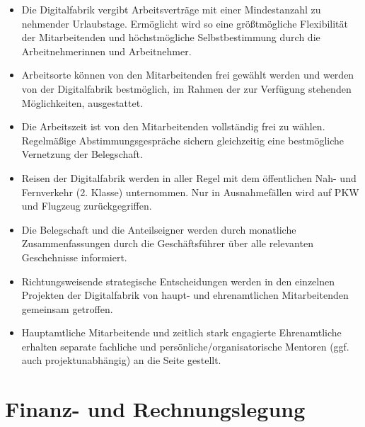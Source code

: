 \documentclass[12pt, a4paper]{article} %
\begin{document}
\begin{itemize}
\item
 
  Die Digitalfabrik vergibt Arbeitsverträge mit einer Mindestanzahl zu
  nehmender Urlaubstage. Ermöglicht wird so eine größtmögliche
  Flexibilität der Mitarbeitenden und höchstmögliche Selbstbestimmung
  durch die Arbeitnehmerinnen und Arbeitnehmer.

\item

  Arbeitsorte können von den Mitarbeitenden frei gewählt werden und
  werden von der Digitalfabrik bestmöglich, im Rahmen der zur Verfügung
  stehenden Möglichkeiten, ausgestattet.
  
\item

  Die Arbeitszeit ist von den Mitarbeitenden vollständig frei zu wählen.
  Regelmäßige Abstimmungsgespräche sichern gleichzeitig eine
  bestmögliche Vernetzung der Belegschaft.

\item
  
  Reisen der Digitalfabrik werden in aller Regel mit dem öffentlichen
  Nah- und Fernverkehr (2. Klasse) unternommen. Nur in Ausnahmefällen
  wird auf PKW und Flugzeug zurückgegriffen.
  
\item
 
  Die Belegschaft und die Anteilseigner werden durch monatliche
  Zusammenfassungen durch die Geschäftsführer über alle relevanten
  Geschehnisse informiert.
 
\item
  
  Richtungsweisende strategische Entscheidungen werden in den einzelnen
  Projekten der Digitalfabrik von haupt- und ehrenamtlichen
  Mitarbeitenden gemeinsam getroffen.
 
\item
 
  Hauptamtliche Mitarbeitende und zeitlich stark engagierte
  Ehrenamtliche erhalten separate fachliche und
  persönliche/organisatorische Mentoren (ggf. auch projektunabhängig) an
  die Seite gestellt.

\end{itemize}

\hypertarget{finanz--und-rechnungslegung}{%
\section{Finanz- und
Rechnungslegung}\label{finanz--und-rechnungslegung}}
\end{document}
